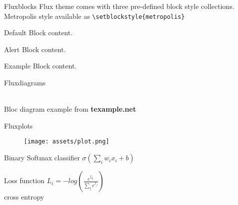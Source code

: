 \documentclass[9pt]{beamer}
\begin{document}
		\begin{frame}[fragile]{Flux}{blocks}
			Flux theme comes with three pre-defined block style collections.\\
			Metropolis style available as \verb+\setblockstyle{metropolis}+\\[0.5cm]
			
			\centering
			\begin{minipage}[b]{0.5\textwidth}
				
				\begin{block}{Default}
					Block content.
				\end{block}
				
				\begin{alertblock}{Alert}
					Block content.
				\end{alertblock}
				
				\begin{exampleblock}{Example}
					Block content.
				\end{exampleblock}      
				
			\end{minipage}
			
		\end{frame}
		
		\begin{frame}{Flux}{diagrams}
			\centering
			\\[0.4cm]
			Bloc diagram example from \textbf{texample.net}
		\end{frame}
		
		\begin{frame}{Flux}{plots}
			\begin{minipage}{0.56\textwidth}
				\begin{figure}
					\texttt{[image: assets/plot.png]}
				\end{figure}
			\end{minipage}
			\hfill
			\begin{minipage}{0.38\textwidth}
				\begin{block}{Binary Softmax classifier}
					\centering
					$\sigma(\sum_i w_ix_i + b)$
				\end{block}
				\begin{exampleblock}{Loss function}
					\centering\vspace*{0.1cm}
					$L_i = -log(\frac{e^{f_{y_i}}}{\sum_j e^{f_j}})$\\[0.1cm]
					cross entropy
				\end{exampleblock}
			\end{minipage}
		\end{frame}
		
\end{document}
